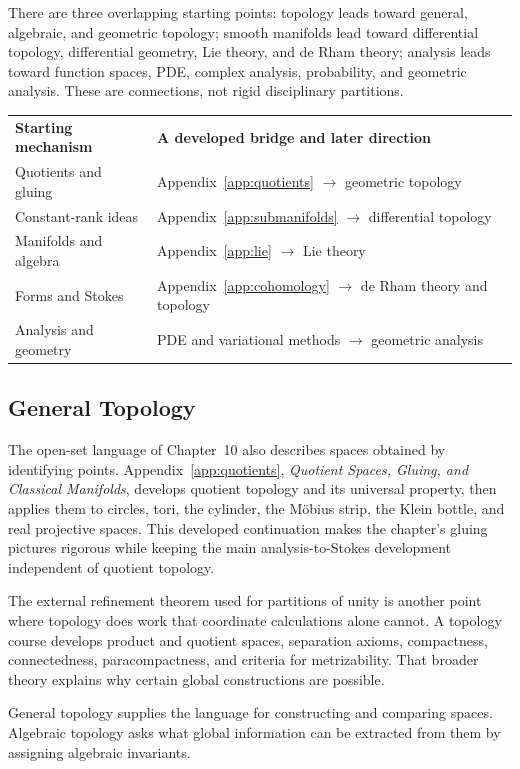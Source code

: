 There are three overlapping starting points: topology leads toward general,
algebraic, and geometric topology; smooth manifolds lead toward differential
topology, differential geometry, Lie theory, and de Rham theory; analysis
leads toward function spaces, PDE, complex analysis, probability, and
geometric analysis. These are connections, not rigid disciplinary partitions.
\begin{center}
\begin{tabular}{p{.30\linewidth}p{.58\linewidth}}
\textbf{Starting mechanism}&\textbf{A developed bridge and later direction}\\[3pt]
Quotients and gluing&Appendix~\ref{app:quotients} $\to$ geometric topology\\
Constant-rank ideas&Appendix~\ref{app:submanifolds} $\to$ differential topology\\
Manifolds and algebra&Appendix~\ref{app:lie} $\to$ Lie theory\\
Forms and Stokes&Appendix~\ref{app:cohomology} $\to$ de Rham theory and topology\\
Analysis and geometry&PDE and variational methods $\to$ geometric analysis
\end{tabular}
\end{center}

\subsection*{General Topology}

The open-set language of Chapter~10 also describes spaces obtained by
identifying points. Appendix~\ref{app:quotients}, \emph{Quotient Spaces,
Gluing, and Classical Manifolds}, develops quotient topology
and its universal property, then applies them to circles, tori, the cylinder, the
M\"obius strip, the Klein bottle, and real projective spaces. This developed
continuation makes the chapter's gluing pictures rigorous while keeping the main
analysis-to-Stokes development independent of quotient topology.

The external refinement theorem used for partitions of unity is another
point where topology does work that coordinate calculations alone cannot.
A topology course develops product and quotient spaces, separation axioms,
compactness, connectedness, paracompactness, and criteria for metrizability.
That broader theory explains why certain global constructions are possible.

General topology supplies the language for constructing and comparing
spaces. Algebraic topology asks what global information can be extracted
from them by assigning algebraic invariants.

